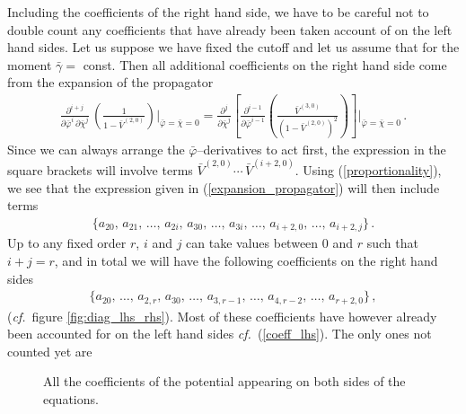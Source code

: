 \documentclass[11pt]{book} %
\newcommand\cf{\textit{cf.}\ }
\numberwithin{equation}{chapter}
\begin{document}
Including the coefficients of the right hand side,
we have to be careful not to double count any coefficients that have already been taken account of on the
left hand sides. Let us suppose we have fixed the cutoff and let us assume that for the
moment $\bar{\gamma} =$ const. Then all additional coefficients on the right hand side come from the
expansion of the propagator
\begin{align}
  \label{expansion_propagator}
  \frac{\partial^{i+j}}{\partial \bar\varphi^i \, \partial \bar\chi^j} \, \left( \frac{1}{1 - \bar V^{(2,0)}} \right) \bigg|_{\bar\varphi = \bar\chi = 0} =
  \frac{\partial^{j}}{\partial \bar\chi^j} \left[ \frac{\partial^{i-1}}{\partial \bar\varphi^{i-1}} \left( \frac{\bar V^{(3,0)}}{(1 - \bar V^{(2,0)})^2} \right) \right] \Bigg|_{\bar\varphi = \bar\chi = 0}\, .
\end{align}
Since we can always arrange the $\bar\varphi$--derivatives to act first,
the expression in the square brackets will involve terms $\bar V^{(2,0)} \cdots \, \bar V^{(i+2,0)}$.
Using (\ref{proportionality}), we see that the expression given in (\ref{expansion_propagator}) will
then include terms
\begin{align}
  \bigg\lbrace
  a_{20},\, a_{21},\, \dots ,\, a_{2i},\, a_{30},\, \dots ,\, a_{3i},\, \dots,\, a_{i+2,0},\, \dots,\, a_{i+2,j}
  \bigg\rbrace \,.
\end{align}
Up to any fixed order $r$, $i$ and $j$ can take values between $0$ and $r$ such that $i+j = r$,
and in total we will have the following coefficients on the right hand sides
%     
\begin{align}
  \bigg\lbrace
  a_{20},\, \dots ,\, a_{2,r},\, a_{30},\, \dots ,\, a_{3,r-1},\, \dots ,\, a_{4,r-2},\, \dots,\, a_{r+2,0}
  \bigg\rbrace \,,
\end{align}
(\cf figure \ref{fig:diag_lhs_rhs}).
Most of these coefficients have however already been accounted for on the left hand sides
\cf (\ref{coeff_lhs}). The only ones not counted yet are
\begin{figure}
  \begin{center}
    
  \end{center}
  \caption{
    All the coefficients of the potential appearing on both sides of the equations.
  }
  \label{fig:diag-all}
\end{figure}
\end{document}
